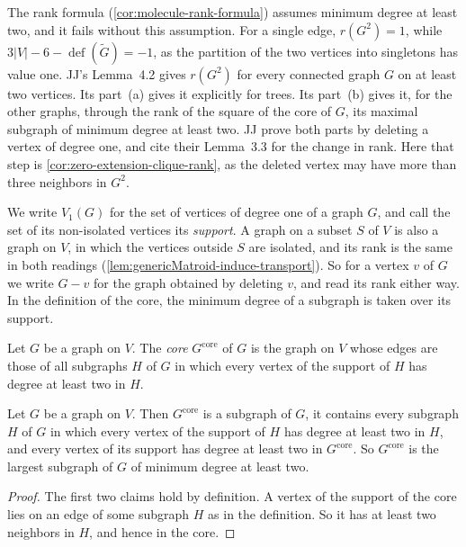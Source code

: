 The rank formula (\cref{cor:molecule-rank-formula}) assumes minimum
degree at least two, and it fails without this assumption. For a single
edge, $r(G^2) = 1$, while $3|V| - 6 - \operatorname{def}(\tilde G) = -1$,
as the partition of the two vertices into singletons has value one.
JJ's Lemma~4.2 gives $r(G^2)$ for every connected graph $G$ on at least
two vertices. Its part~(a) gives it explicitly for trees. Its part~(b)
gives it, for the other graphs, through the rank of the square of the
core of $G$, its maximal subgraph of minimum degree at least two.
JJ prove both parts by deleting a vertex of degree one, and cite their
Lemma~3.3 for the change in rank. Here that step is
\cref{cor:zero-extension-clique-rank}, as the deleted vertex may have
more than three neighbors in $G^2$.

We write $V_1(G)$ for the set of vertices of degree one of a graph $G$,
and call the set of its non-isolated vertices its \emph{support}. A
graph on a subset $S$ of $V$ is also a graph on $V$, in which the
vertices outside $S$ are isolated, and its rank is the same in both
readings (\cref{lem:genericMatroid-induce-transport}). So for a vertex
$v$ of $G$ we write $G - v$ for the graph obtained by deleting $v$, and
read its rank either way. In the definition of the core, the minimum
degree of a subgraph is taken over its support.

\begin{definition}
  \label{def:two-core}
  \leanok
  Let $G$ be a graph on $V$. The \emph{core} $G^{\mathrm{core}}$ of $G$
  is the graph on $V$ whose edges are those of all subgraphs $H$ of $G$
  in which every vertex of the support of $H$ has degree at least two
  in $H$.
\end{definition}

\begin{lemma}
  \label{lem:two-core-largest}
  \leanok
  Let $G$ be a graph on $V$. Then $G^{\mathrm{core}}$ is a subgraph of
  $G$, it contains every subgraph $H$ of $G$ in which every vertex of
  the support of $H$ has degree at least two in $H$, and every vertex
  of its support has degree at least two in $G^{\mathrm{core}}$. So
  $G^{\mathrm{core}}$ is the largest subgraph of $G$ of minimum degree
  at least two.
\end{lemma}
\begin{proof}
  \leanok
  The first two claims hold by definition. A vertex of the support of
  the core lies on an edge of some subgraph $H$ as in the definition.
  So it has at least two neighbors in $H$, and hence in the core.
\end{proof}

